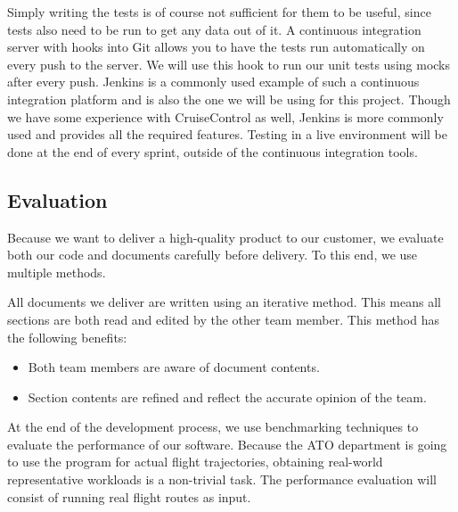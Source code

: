 Simply writing the tests is of course not suﬃcient for them to be useful, since tests also need to be run to get any data out of it. A continuous integration server with hooks into Git allows you to have the tests run automatically on every push to the server. We will use this hook to run our unit tests using mocks after every push. Jenkins is a commonly used example of such a continuous integration platform and is also the one we will be using for this project. Though we have some experience with CruiseControl as well, Jenkins is more commonly used and provides all the required features. Testing in a live environment will be done at the end of every sprint, outside of the continuous integration tools.

\subsection{Evaluation}
Because we want to deliver a high-quality product to our customer, we evaluate both our code and documents carefully before delivery. To this end, we use multiple methods.

All documents we deliver are written using an iterative method. This means all sections are both read and edited by the other team member. This method has the following beneﬁts:
\begin{itemize}
\item Both team members are aware of document contents.

\item Section contents are reﬁned and reﬂect the accurate opinion of the team.
\end{itemize}

At the end of the development process, we use benchmarking techniques to evaluate the performance of our software. Because the ATO department is going to use the program for actual flight trajectories, obtaining real-world representative workloads is a non-trivial task. The performance evaluation will consist of running real flight routes as input.